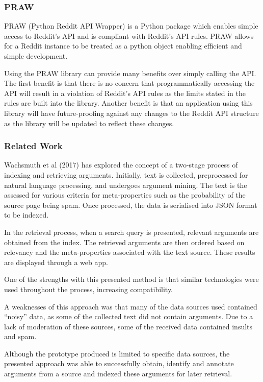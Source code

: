 \documentclass[12pt,a4paper]{article}
\begin{document}
\subsubsection{PRAW}

PRAW (Python Reddit API Wrapper) is a Python package which enables simple access to Reddit's API and is compliant with Reddit's API rules. PRAW allows for a Reddit instance to be treated as a python object enabling efficient and simple development.

Using the PRAW library can provide many benefits over simply calling the API. The first benefit is that there is no concern that programmatically accessing the API will result in a violation of Reddit's API rules as the limits stated in the rules are built into the library. Another benefit is that an application using this library will have future-proofing against any changes to the Reddit API structure as the library will be updated to reflect these changes.

\subsubsection{Related Work}

Wachsmuth et al (2017) has explored the concept of a two-stage process of indexing and retrieving arguments. Initially, text is collected, preprocessed for natural language processing, and undergoes argument mining. The text is the assessed for various criteria for meta-properties such as the probability of the source page being spam. Once processed, the data is serialised into JSON format to be indexed.

In the retrieval process, when a search query is presented, relevant arguments are obtained from the index. The retrieved arguments are then ordered based on relevancy and the meta-properties associated with the text source. These results are displayed through a web app.

One of the strengths with this presented method is that similar technologies were used throughout the process, increasing compatibility.

A weaknesses of this approach was that many of the data sources used contained ``noisy'' data, as some of the collected text did not contain arguments. Due to a lack of moderation of these sources, some of the received data contained insults and spam.

Although the prototype produced is limited to specific data sources, the presented approach was able to successfully obtain, identify and annotate arguments from a source and indexed these arguments for later retrieval.
\end{document}
